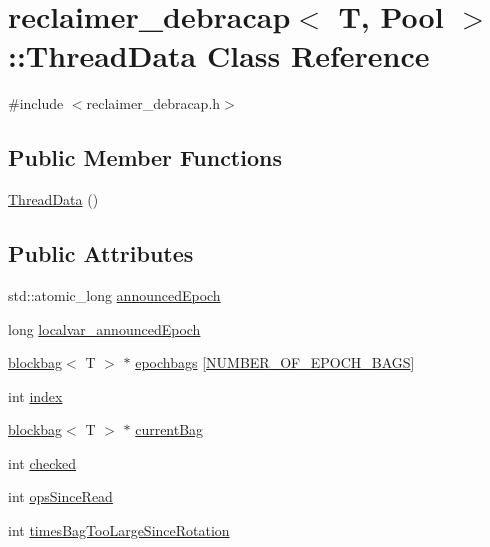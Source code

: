 \hypertarget{classreclaimer__debracap_1_1ThreadData}{}\section{reclaimer\+\_\+debracap$<$ T, Pool $>$\+:\+:Thread\+Data Class Reference}
\label{classreclaimer__debracap_1_1ThreadData}


{\ttfamily \#include $<$reclaimer\+\_\+debracap.\+h$>$}

\subsection*{Public Member Functions}
\begin{DoxyCompactItemize}
\item 
\hyperlink{classreclaimer__debracap_1_1ThreadData_a9261b7ee9d25732cbf85ffc86ecc9a0d}{Thread\+Data} ()
\end{DoxyCompactItemize}
\subsection*{Public Attributes}
\begin{DoxyCompactItemize}
\item 
std\+::atomic\+\_\+long \hyperlink{classreclaimer__debracap_1_1ThreadData_a1945683fff11e2ff4b1e67ab7608e611}{announced\+Epoch}
\item 
long \hyperlink{classreclaimer__debracap_1_1ThreadData_a3c2208d42126409c6d831ec546effa73}{localvar\+\_\+announced\+Epoch}
\item 
\hyperlink{classblockbag}{blockbag}$<$ T $>$ $\ast$ \hyperlink{classreclaimer__debracap_1_1ThreadData_ac8cb4f998e1b5dbda8452b9798810db0}{epochbags} \mbox{[}\hyperlink{reclaimer__ebr__tree__q_8h_acc0cc9ce1a68a29c4e0e126887b517dd}{N\+U\+M\+B\+E\+R\+\_\+\+O\+F\+\_\+\+E\+P\+O\+C\+H\+\_\+\+B\+A\+GS}\mbox{]}
\item 
int \hyperlink{classreclaimer__debracap_1_1ThreadData_af4c3bb0b83bafe5cd3d0a6f44e523fee}{index}
\item 
\hyperlink{classblockbag}{blockbag}$<$ T $>$ $\ast$ \hyperlink{classreclaimer__debracap_1_1ThreadData_a2d41da34bc867760dc217af79f6cf34a}{current\+Bag}
\item 
int \hyperlink{classreclaimer__debracap_1_1ThreadData_a9c2dba809417c7086f6e804131e04678}{checked}
\item 
int \hyperlink{classreclaimer__debracap_1_1ThreadData_abfbcde4f274cdf53bf45f93450146edf}{ops\+Since\+Read}
\item 
int \hyperlink{classreclaimer__debracap_1_1ThreadData_ad14c2b8766f794f6c2c3ca426e0d932e}{times\+Bag\+Too\+Large\+Since\+Rotation}
\end{DoxyCompactItemize}


